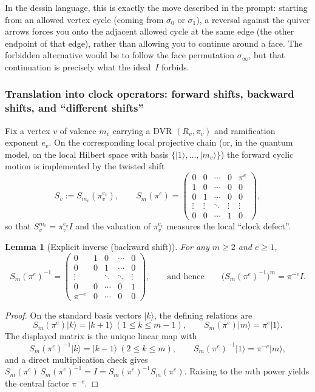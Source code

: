 \documentclass[11pt,oneside]{amsbook}
\numberwithin{equation}{section}
\theoremstyle{plain}
\newtheorem{lemma}[theorem]{Lemma}
\theoremstyle{definition}
\theoremstyle{remark}
\newcommand{\ket}[1]{\lvert #1 \rangle}
\begin{document}
\begin{enumerate}
In the dessin language, this is exactly the move described in the prompt:
starting from an allowed vertex cycle (coming from $\sigma_0$ or $\sigma_1$), a reversal against the quiver arrows forces you onto the
adjacent allowed cycle at the same edge (the other endpoint of that edge), rather than allowing you to continue around a face.
The forbidden alternative would be to follow the face permutation $\sigma_\infty$, but that continuation is precisely what the ideal~$I$ forbids.

\subsubsection{Translation into clock operators: forward shifts, backward shifts, and ``different shifts''}

Fix a vertex $v$ of valence $m_v$ carrying a DVR $(R_v,\pi_v)$ and ramification exponent $e_v$.
On the corresponding local projective chain (or, in the quantum model, on the local Hilbert space with basis $\{\ket{1},\dots,\ket{m_v}\}$)
the forward cyclic motion is implemented by the twisted shift
\[
S_v:=S_{m_v}(\pi_v^{e_v}),
\qquad
S_{m}(\pi^e)=
\begin{pmatrix}
0 & 0 & \cdots & 0 & \pi^e\\
1 & 0 & \cdots & 0 & 0\\
0 & 1 & \cdots & 0 & 0\\
\vdots & \vdots & \ddots & \vdots & \vdots\\
0 & 0 & \cdots & 1 & 0
\end{pmatrix},
\]
so that $S_v^{m_v}=\pi_v^{e_v}I$ and the valuation of $\pi_v^{e_v}$ measures the local ``clock defect''.

\begin{lemma}[Explicit inverse (backward shift)]
\label{lem:twisted_shift_inverse}
For any $m\ge 2$ and $e\ge 1$,
\[
S_m(\pi^e)^{-1}=
\begin{pmatrix}
0 & 1 & 0 & \cdots & 0\\
0 & 0 & 1 & \cdots & 0\\
\vdots &  & \ddots & \ddots & \vdots\\
0 & 0 & \cdots & 0 & 1\\
\pi^{-e} & 0 & \cdots & 0 & 0
\end{pmatrix},
\qquad\text{and hence}\qquad
\bigl(S_m(\pi^e)^{-1}\bigr)^m=\pi^{-e}I.
\]
\end{lemma}

\begin{proof}
On the standard basis vectors $\ket{k}$, the defining relations are
\[
S_m(\pi^e)\ket{k}=\ket{k+1}\ (1\le k\le m-1),\qquad S_m(\pi^e)\ket{m}=\pi^e\ket{1}.
\]
The displayed matrix is the unique linear map with
\[
S_m(\pi^e)^{-1}\ket{k}=\ket{k-1}\ (2\le k\le m),\qquad S_m(\pi^e)^{-1}\ket{1}=\pi^{-e}\ket{m},
\]
and a direct multiplication check gives $S_m(\pi^e)\,S_m(\pi^e)^{-1}=I=S_m(\pi^e)^{-1}S_m(\pi^e)$.
Raising to the $m$th power yields the central factor $\pi^{-e}$.
\end{proof}


\end{enumerate}
\end{document}
